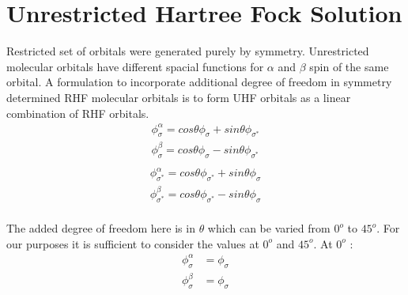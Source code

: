 \documentclass[11pt]{article}   	%
\begin{document}
\section{Unrestricted Hartree Fock Solution}
	Restricted set of orbitals were generated purely by symmetry. Unrestricted molecular orbitals have different 
	spacial functions for $\alpha$ and $\beta$ spin of the same orbital. A formulation to incorporate additional degree of freedom in symmetry 
	determined RHF molecular orbitals is to form UHF orbitals as a linear combination of RHF orbitals. \\
	\begin{equation}
	\begin{split}
		\phi_{\sigma}^{\alpha}=cos\theta \phi_{\sigma}+sin\theta \phi_{\sigma^*}\\
		\phi_{\sigma}^{\beta}=cos\theta \phi_{\sigma}-sin\theta \phi_{\sigma^*}\\
	\end{split}
	\end{equation}
	\begin{equation}
	\begin{split}
		\phi_{\sigma^*}^{\alpha}=cos\theta \phi_{\sigma^*}+sin\theta \phi_{\sigma}\\
		\phi_{\sigma^*}^{\beta}=cos\theta \phi_{\sigma^*}-sin\theta \phi_{\sigma}\\
	\end{split}
	\end{equation}
	
	The added degree of freedom here is in $\theta$ which can be varied from $0^o$ to $45^o$. For our purposes it is sufficient to consider the 
	values at $0^o$ and $45^o$. At $0^o$ :\\
	\begin{equation}
		\begin{split}
		\phi_{\sigma}^{\alpha}&=\phi_{\sigma}\\
		\phi_{\sigma}^{\beta}&=\phi_{\sigma}\\
		\end{split}
	\end{equation}
	
\end{document}
